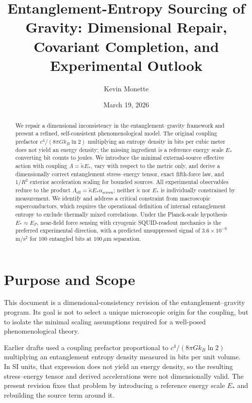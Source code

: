 \documentclass[11pt]{article}
\title{Entanglement-Entropy Sourcing of Gravity: Dimensional Repair,\\Covariant Completion, and Experimental Outlook}
\author{Kevin Monette}
\date{March 19, 2026}
\theoremstyle{plain}
\theoremstyle{definition}
\theoremstyle{remark}
\begin{document}
\maketitle

\begin{abstract}
We repair a dimensional inconsistency in the entanglement--gravity framework and present a refined, self-consistent phenomenological model. The original coupling prefactor $c^4/(8\pi Gk_B\ln 2)$ multiplying an entropy density in bits per cubic meter does not yield an energy density; the missing ingredient is a reference energy scale $E_*$ converting bit counts to joules. We introduce the minimal external-source effective action with coupling $\Lambda = \tilde{\kappa}E_*$, vary with respect to the metric only, and derive a dimensionally correct entanglement stress--energy tensor, exact fifth-force law, and $1/R^2$ exterior acceleration scaling for bounded sources. All experimental observables reduce to the product $\Lambda_{\mathrm{eff}} = \tilde{\kappa}E_*\alpha_{\mathrm{screen}}$; neither $\tilde{\kappa}$ nor $E_*$ is individually constrained by measurement. We identify and address a critical constraint from macroscopic superconductors, which requires the operational definition of internal entanglement entropy to exclude thermally mixed correlations. Under the Planck-scale hypothesis $E_* \approx E_P$, near-field force sensing with cryogenic SQUID-readout mechanics is the preferred experimental direction, with a predicted unsuppressed signal of $3.6\times10^{-9}$\,m/s$^2$ for 100 entangled bits at $100\,\mu$m separation.
\end{abstract}

\section{Purpose and Scope}

This document is a dimensional-consistency revision of the entanglement--gravity program. Its goal is not to select a unique microscopic origin for the coupling, but to isolate the minimal scaling assumptions required for a well-posed phenomenological theory.

Earlier drafts used a coupling prefactor proportional to $c^4/(8\pi G k_B \ln 2)$ multiplying an entanglement entropy density measured in bits per unit volume. In SI units, that expression does not yield an energy density, so the resulting stress--energy tensor and derived accelerations were not dimensionally valid. The present revision fixes that problem by introducing a reference energy scale $E_*$ and rebuilding the source term around it.
\end{document}
